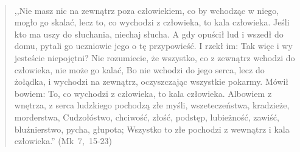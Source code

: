 \documentclass[10pt,a4paper,oneside]{article}
\begin{document}
\paragraph{}
\begin{quote}
,,Nie masz nic na zewnątrz poza człowiekiem, co by wchodząc w niego, mogło go skalać, lecz to, co wychodzi z człowieka, to kala człowieka. Jeśli kto ma uszy do słuchania, niechaj słucha. A gdy opuścił lud i wszedł do domu, pytali go uczniowie jego o tę przypowieść. I rzekł im: Tak więc i wy jesteście niepojętni? Nie rozumiecie, że wszystko, co z zewnątrz wchodzi do człowieka, nie może go kalać, Bo nie wchodzi do jego serca, lecz do żołądka, i wychodzi na zewnątrz, oczyszczając wszystkie pokarmy. Mówił bowiem: To, co wychodzi z człowieka, to kala człowieka. Albowiem z wnętrza, z serca ludzkiego pochodzą złe myśli, wszeteczeństwa, kradzieże, morderstwa, Cudzołóstwo, chciwość, złość, podstęp, lubieżność, zawiść, bluźnierstwo, pycha, głupota; Wszystko to złe pochodzi z wewnątrz i kala człowieka.'' \mbox{(Mk 7, 15-23)}
\end{quote}
\end{document}
